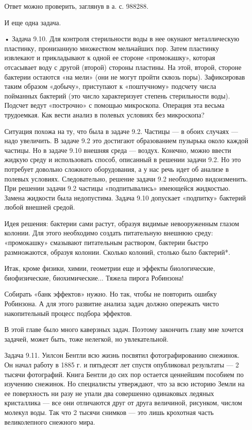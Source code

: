 Ответ можно проверить, заглянув в а. с. 988288.


И еще одна задача.


•  Задача  9.10.   Для  контроля  стерильности  воды   в  нее  окунают
металлическую пластинку, пронизанную  множеством мельчайших пор. Затем
пластинку извлекают  и прикладывают  к одной ее  стороне «промокашку»,
которая  отсасывает  воду  с  другой  (второй)  стороны  пластины.  На
этой,  второй,  стороне бактерии  остаются  «на  мели» (они  не  могут
пройти сквозь  поры). Зафиксировав таким образом  «добычу», приступают
к   «поштучному»  подсчету   числа  пойманных   бактерий  (это   число
характеризует степень стерильности воды).  Подсчет ведут «построчно» с
помощью микроскопа. Операция эта весьма трудоемкая. Как вести анализ в
полевых условиях без микроскопа?

Ситуация  похожа на  ту, что  была  в задаче  9.2. Частицы  — в  обоих
случаях  — надо  увеличить. В  задаче 9.2  это достигают  образованием
пузырька  около каждой  частицы.  Но  в задаче  9.10  внешняя среда  —
воздух.  Конечно, можно  ввести  жидкую среду  и использовать  способ,
описанный в  решении задачи  9.2. Но  это потребует  довольно сложного
оборудования,  а  у нас  речь  идет  об  анализе в  полевых  условиях.
Следовательно, решение задачи 9.2 необходимо видоизменить. При решении
задачи  9.2   частицы  «подпитывались»  имеющейся   жидкостью.  Замена
жидкости была  недопустима. Задача 9.10 допускает  «подпитку» бактерий
любой внешней средой.

Идея  решения: бактерии  сами  растут,  образуя видимые  невооруженным
глазом  колонии.  Для  этого необходимо  создать  питательную  внешнюю
среду: «промокашку»  смазывают питательным раствором,  бактерии быстро
размножаются,   образуя  колонии.   Сколько   колоний,  столько   было
бактерий*.

Итак,  кроме физики,  химии,  геометрии еще  и эффекты  биологические,
биофизические, биохимические... Тяжела пирога Робинзона!

Собирать  «банк эффектов»  нужно. Но  так, чтобы  не повторить  ошибку
Робинзона. А для  этого развитие анализа задач  должно опережать чисто
накопительный процесс подбора эффектов.


В этой главе  было много каверзных задач. Поэтому  закончить главу мне
хочется задачей, может быть, тоже нелегкой, но увлекательной.

Задача  9.11.  Уилсон  Бентли   всю  жизнь  посвятил  фотографированию
снежинок. Он начал работу в 1885 г. и пятьдесят лет спустя опубликовал
результаты —  2 тысячи  фотографий. Книга Бентли  до сих  пор остается
ценнейшим пособием  по изучению  снежинок. Но  специалисты утверждают,
что  за всю  историю Земли  на  ее поверхность  ни разу  не упали  два
совершенно одинаковых ледяных кристаллика — все они отличаются друг от
друга  величиной, рисунком,  числом  молекул воды.  Так  что 2  тысячи
снимков — это лишь крохотная часть великолепного снежного мира.

